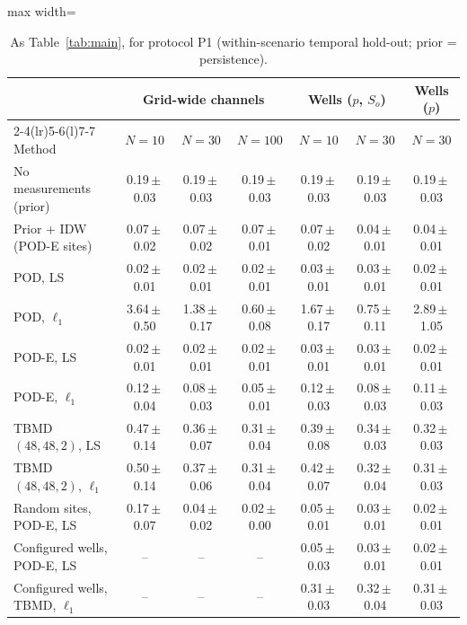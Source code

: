 \begin{table}[tbp]
\centering
\scriptsize
\setlength{\tabcolsep}{2.5pt}
\caption{As Table~\ref{tab:main}, for protocol P1 (within-scenario temporal hold-out; prior = persistence).}
\label{tab:S_P1}
\begin{adjustbox}{max width=\linewidth}
\begin{tabular}{@{}lcccccc@{}}
\toprule
 & \multicolumn{3}{c}{Grid-wide channels} & \multicolumn{2}{c}{Wells ($p$, $S_o$)} & Wells ($p$) \\
\cmidrule(lr){2-4}\cmidrule(lr){5-6}\cmidrule(l){7-7}
Method & $N=10$ & $N=30$ & $N=100$ & $N=10$ & $N=30$ & $N=30$ \\
\midrule
No measurements (prior) & 0.19\,$\pm$\,0.03 & 0.19\,$\pm$\,0.03 & 0.19\,$\pm$\,0.03 & 0.19\,$\pm$\,0.03 & 0.19\,$\pm$\,0.03 & 0.19\,$\pm$\,0.03 \\
Prior + IDW (POD-E sites) & 0.07\,$\pm$\,0.02 & 0.07\,$\pm$\,0.02 & 0.07\,$\pm$\,0.01 & 0.07\,$\pm$\,0.02 & 0.04\,$\pm$\,0.01 & 0.04\,$\pm$\,0.01 \\
POD, LS & 0.02\,$\pm$\,0.01 & 0.02\,$\pm$\,0.01 & 0.02\,$\pm$\,0.01 & 0.03\,$\pm$\,0.01 & 0.03\,$\pm$\,0.01 & 0.02\,$\pm$\,0.01 \\
POD, $\ell_1$ & 3.64\,$\pm$\,0.50 & 1.38\,$\pm$\,0.17 & 0.60\,$\pm$\,0.08 & 1.67\,$\pm$\,0.17 & 0.75\,$\pm$\,0.11 & 2.89\,$\pm$\,1.05 \\
POD-E, LS & 0.02\,$\pm$\,0.01 & 0.02\,$\pm$\,0.01 & 0.02\,$\pm$\,0.01 & 0.03\,$\pm$\,0.01 & 0.03\,$\pm$\,0.01 & 0.02\,$\pm$\,0.01 \\
POD-E, $\ell_1$ & 0.12\,$\pm$\,0.04 & 0.08\,$\pm$\,0.03 & 0.05\,$\pm$\,0.01 & 0.12\,$\pm$\,0.03 & 0.08\,$\pm$\,0.03 & 0.11\,$\pm$\,0.03 \\
TBMD $(48,48,2)$, LS & 0.47\,$\pm$\,0.14 & 0.36\,$\pm$\,0.07 & 0.31\,$\pm$\,0.04 & 0.39\,$\pm$\,0.08 & 0.34\,$\pm$\,0.03 & 0.32\,$\pm$\,0.03 \\
TBMD $(48,48,2)$, $\ell_1$ & 0.50\,$\pm$\,0.14 & 0.37\,$\pm$\,0.06 & 0.31\,$\pm$\,0.04 & 0.42\,$\pm$\,0.07 & 0.32\,$\pm$\,0.04 & 0.31\,$\pm$\,0.03 \\
Random sites, POD-E, LS & 0.17\,$\pm$\,0.07 & 0.04\,$\pm$\,0.02 & 0.02\,$\pm$\,0.00 & 0.05\,$\pm$\,0.01 & 0.03\,$\pm$\,0.01 & 0.02\,$\pm$\,0.01 \\
Configured wells, POD-E, LS & -- & -- & -- & 0.05\,$\pm$\,0.03 & 0.03\,$\pm$\,0.01 & 0.02\,$\pm$\,0.01 \\
Configured wells, TBMD, $\ell_1$ & -- & -- & -- & 0.31\,$\pm$\,0.03 & 0.32\,$\pm$\,0.04 & 0.31\,$\pm$\,0.03 \\
\bottomrule
\end{tabular}
\end{adjustbox}
\end{table}
